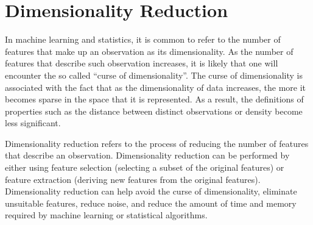 \section{Dimensionality Reduction} \label{sect:meth:dim-reduction}
In machine learning and statistics, it is common to refer to the number of features that make up an observation as its dimensionality. As the number of features that describe such observation increases, it is likely that one will encounter the so called ``curse of dimensionality''. The curse of dimensionality is associated with the fact that as the dimensionality of data increases, the more it becomes sparse in the space that it is represented. As a result, the definitions of properties such as the distance between distinct observations or density become less significant. \newline

Dimensionality reduction refers to the process of reducing the number of features that describe an observation. Dimensionality reduction can be performed by either using feature selection (selecting a subset of the original features) or feature extraction (deriving new features from the original features). Dimensionality reduction can help avoid the curse of dimensionality, eliminate unsuitable features, reduce noise, and reduce the amount of time and memory required by machine learning or statistical algorithms. \newline

